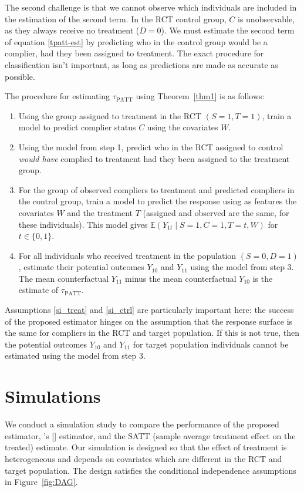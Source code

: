 \documentclass[12pt]{article}
\newcommand{\ex}{\mathbb{E}} %
\newcommand{\possessivecite}[1]{\citeauthor{#1}'s [\citeyear{#1}]}
\begin{document}
The second challenge is that we cannot observe which individuals are included in the estimation of the second term. In the RCT control group, $C$ is unobservable, as they always receive no treatment ($D=0$).  We must estimate the second term of equation \eqref{tpatt-est} by predicting who in the control group would be a complier, had they been assigned to treatment.  The exact procedure for classification isn't important, as long as predictions are made as accurate as possible.

The procedure for estimating $\tau_{\text{PATT}}$ using Theorem~\ref{thm1} is as follows:
\begin{enumerate}
\item Using the group assigned to treatment in the RCT $(S=1, T=1)$, train a model to predict complier status $C$ using the covariates $W$.
\item Using the model from step 1, predict who in the RCT assigned to control \textit{would have} complied to treatment had they been assigned to the treatment group.
\item For the group of observed compliers to treatment and predicted compliers in the control group, train a model to predict the response using as features the covariates $W$ and the treatment $T$ (assigned and observed are the same, for these individuals).  This model gives $\ex(Y_{1t} \mid S=1, C=1, T=t, W)$ for $t \in \{0,1\}$.
\item For all individuals who received treatment in the population $(S=0, D=1)$, estimate their potential outcomes $Y_{10}$ and $Y_{11}$ using the model from step 3.  The mean counterfactual $Y_{11}$ minus the mean counterfactual $Y_{10}$ is the estimate of $\tau_{\text{PATT}}$.
\end{enumerate}

Assumptions \eqref{si_treat} and \eqref{si_ctrl} are particularly important here: the success of the proposed estimator hinges on the assumption that the response surface is the same for compliers in the RCT and target population.  If this is not true, then the potential outcomes $Y_{10}$ and $Y_{11}$ for target population individuals cannot be estimated using the model from step 3.

\section{Simulations} \label{sim}
We conduct a simulation study to compare the performance of the proposed estimator, \possessivecite{Hartman} estimator, and the SATT (sample average treatment effect on the treated) estimate.  Our simulation is designed so that the effect of treatment is heterogeneous and depends on covariates which are different in the RCT and target population. The design satisfies the conditional independence assumptions in Figure~\ref{fig:DAG}.
\end{document}
